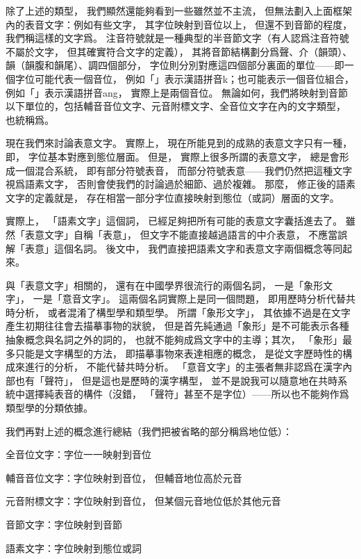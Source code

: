 除了上述的類型，
我們顯然還能夠看到一些雖然並不主流，
但無法劃入上面框架內的表音文字：例如有些文字，
其字位映射到音位以上，
但還不到音節的程度，
我們稱這樣的文字爲。
注音符號就是一種典型的半音節文字（有人認爲注音符號不屬於文字，
但其確實符合文字的定義），
其將音節結構劃分爲聲、介（韻頭）、韻（韻腹和韻尾）、調四個部分，
字位則分別對應這四個部分裏面的單位——即一個字位可能代表一個音位，
例如「」表示漢語拼音k；也可能表示一個音位組合，
例如「」表示漢語拼音ang，
實際上是兩個音位。
無論如何，我們將映射到音節以下單位的，包括輔音音位文字、元音附標文字、全音位文字在內的文字類型，
也統稱爲。

現在我們來討論表意文字。
實際上，
現在所能見到的成熟的表意文字只有一種，
即，
字位基本對應到態位層面。
但是，
實際上很多所謂的表意文字，
總是會形成一個混合系統，
即有部分符號表音，
而部分符號表意——我們仍然把這種文字視爲語素文字，
否則會使我們的討論過於細節、過於複雜。
那麼，
修正後的語素文字的定義就是，
存在相當一部分字位直接映射到態位（或詞）層面的文字。

實際上，
「語素文字」這個詞，
已經足夠把所有可能的表意文字囊括進去了。
雖然「表意文字」自稱「表意」，
但文字不能直接越過語言的中介表意，
不應當誤解「表意」這個名詞。
後文中，
我們直接把語素文字和表意文字兩個概念等同起來。


與「表意文字」相關的，
還有在中國學界很流行的兩個名詞，
一是「象形文字」，
一是「意音文字」。
這兩個名詞實際上是同一個問題，
即用歷時分析代替共時分析，
或者混淆了構型學和類型學。
所謂「象形文字」，
其依據不過是在文字產生初期往往會去描摹事物的狀貌，
但是首先純通過「象形」是不可能表示各種抽象概念與名詞之外的詞的，
也就不能夠成爲文字中的主導；其次，
「象形」最多只能是文字構型的方法，
即描摹事物來表達相應的概念，
是從文字歷時性的構成來進行的分析，
不能代替共時分析。
「意音文字」的主張者無非認爲在漢字內部也有「聲符」，
但是這也是歷時的漢字構型，
並不是說我可以隨意地在共時系統中選擇純表音的構件（沒錯，
「聲符」甚至不是字位）——所以也不能夠作爲類型學的分類依據。


我們再對上述的概念進行總結（我們把被省略的部分稱爲地位低）：
\begin{ExampleBlock}
全音位文字：字位一一映射到音位

輔音音位文字：字位映射到音位，
但輔音地位高於元音

元音附標文字：字位映射到音位，
但某個元音地位低於其他元音

音節文字：字位映射到音節

語素文字：字位映射到態位或詞
\end{ExampleBlock}

